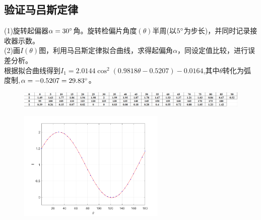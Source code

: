 \documentclass{article}
\begin{document}
\subsection{验证马吕斯定律}
(1)旋转起偏器$\alpha=30\degree$角。旋转检偏片角度$(\theta)$半周(以$5\degree$为步长)，并同时记录接收器示数。\\
(2)画$I(\theta)$图，利用马吕斯定律拟合曲线，求得起偏角$\alpha$，同设定值比较，进行误差分析。\\
\hspace*{2em}根据拟合曲线得到$I_1=2.0144\cos^2(0.9818\theta-0.5207)-0.0164$,其中$\theta$转化为弧度制,$\alpha=-0.5207=29.83\degree$。
\begin{figure}[ht]
    \centering
    \includegraphics[width=12cm]{5.1.png}
\end{figure}
\begin{figure}[ht]
    \centering
    \includegraphics[width=7cm]{1.png}
\end{figure}
\end{document}
